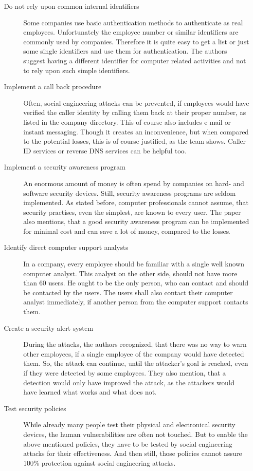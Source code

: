 \begin{description}
  \item[Do not rely upon common internal identifiers] Some companies use basic
  authentication methods to authenticate as real employees. Unfortunately the
  employee number or similar identifiers are commonly used by companies.
  Therefore it is quite easy to get a list or just some single identifiers and
  use them for authentication. The authors suggest having a different
  identifier for computer related activities and not to rely upon such simple
  identifiers.
  \item[Implement a call back procedure] Often, social engineering attacks can
  be prevented, if employees would have verified the caller identity by calling
  them back at their proper number, as listed in the company directory. This of
  course also includes e-mail or instant messaging. Though it creates an
  inconvenience, but when compared to the potential losses, this is of course
  justified, as the team shows. Caller ID services or reverse DNS services can
  be helpful too.
  \item[Implement a security awareness program] An enormous amount of money is
  often spend by companies on hard- and software security devices. Still, security
  awareness programs are seldom implemented. As stated before, computer
  professionals cannot assume, that security practises, even the simplest, are
  known to every user. The paper also mentions, that a good security awareness
  program can be implemented for minimal cost and can save a lot of money,
  compared to the losses.
  \item[Identify direct computer support analysts] In a company, every employee
  should be familiar with a single well known computer analyst. This analyst on
  the other side, should not have more than 60 users. He ought to be the only
  person, who can contact and should be contacted by the users. The users
  shall also contact their computer analyst immediately, if another person
  from the computer support contacts them.
  \item[Create a security alert system] During the attacks, the authors 
  recognized, that there was no way to warn other employees, if a single
  employee of the company would have detected them. So, the attack can
  continue, until the attacker's goal is reached, even if they were detected by some
  employees. They also mention, that a detection would only have improved the
  attack, as the attackers would have learned what works and what does
  not.
  \item[Test security policies] While already many people test their physical
  and electronical security devices, the human vulnerabilities are often not
  touched. But to enable the above mentioned policies, they have to be tested
  by social engineering attacks for their effectiveness. And then still, those
  policies cannot assure 100\% protection against social engineering attacks.
\end{description}

